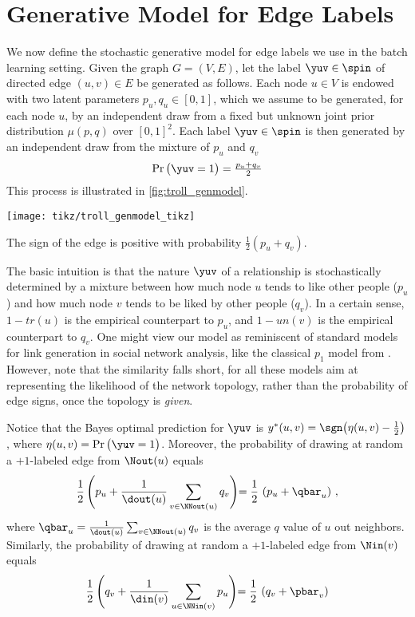 \section{Generative Model for Edge Labels}\label{s:gen}

We now define the stochastic generative model for edge labels we use in the batch learning setting.
Given the graph $G = (V,E)$, let the label $\yuv \in \spin$ of directed edge $(u,v) \in E$ be
generated as follows. Each node $u \in V$ is endowed with two latent parameters $p_u, q_u \in
[0,1]$, which we assume to be generated, for each node $u$, by an independent draw from a fixed but
unknown joint prior distribution $\mu(p,q)$ over $[0,1]^2$. Each label $\yuv \in \spin$ is then
generated by an independent draw from the mixture of $p_u$ and $q_v$
$$\Pr\big( \yuv = 1 \big) = \tfrac{p_u + q_v}{2}$$
This process is illustrated in \autoref{fig:troll_genmodel}.
\begin{marginfigure}
	\centering
	\texttt{[image: tikz/troll\_genmodel\_tikz]}
	\caption{The sign \yuv{} of the edge \euv{} is positive with probability $\frac{1}{2}(p_u+q_v)$.
	\label{fig:troll_genmodel}}
\end{marginfigure}

The basic intuition is that the nature $\yuv$ of a relationship \euv{} is stochastically
determined by a mixture between how much node $u$ tends to like other people ($p_u$) and how much
node $v$ tends to be liked by other people ($q_v$). In a certain sense, $1-tr(u)$ is the empirical
counterpart to $p_u$, and $1-un(v)$ is the empirical counterpart to $q_v$. One might view
our model as reminiscent of standard models for link generation in social network analysis, like the
classical $p_1$ model from \cite{hl81}. However, note that the similarity falls short, for all these
models aim at
representing the likelihood of the network topology, rather than the probability of edge signs, once
the topology is \emph{given}.

Notice that the Bayes optimal prediction for $\yuv$ is $y^*(u,v) = \sgn\big(\eta(u,v) -
\tfrac{1}{2}\big)$, where $\eta(u,v) = \Pr\big( \yuv = 1 \big)$. Moreover, the probability of
drawing at random a $+1$-labeled edge from $\Nout(u)$ equals
\begin{equation}\label{e:pout}
	\frac{1}{2}\,\Biggl(p_u + \frac{1}{\dout(u)} \sum_{v\in \NNout(u)} q_v \Biggl) =
		\frac{1}{2}\,\left(p_u + \qbar_u\right)\,,
\end{equation}
where $\qbar_u = \frac{1}{\dout(u)} \sum_{v\in \NNout(u)} q_v$ is the average $q$ value of $u$ out
neighbors.
Similarly, the probability of drawing at random a $+1$-labeled edge from $\Nin(v)$ equals
\begin{equation}\label{e:pin}
	\frac{1}{2}\,\Biggl(q_v + \frac{1}{\din(v)} \sum_{u\in \NNin(v)} p_u \Biggl)=
		\frac{1}{2}\,\left(q_v + \pbar_v\right)
\end{equation}
